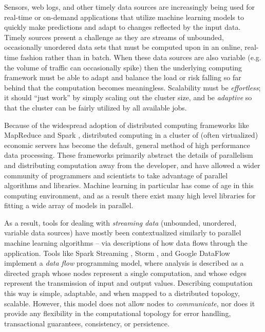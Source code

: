 \documentclass[draftclsnofoot,onecolumn,conference,11pt]{IEEEtran}
\begin{document}
Sensors, web logs, and other timely data sources are increasingly being used for  real-time or on-demand applications that utilize machine learning models to quickly make predictions and adapt to changes reflected by the input data. Timely sources present a challenge as they are streams of unbounded, occasionally unordered data sets that must be computed upon in an online, real-time fashion rather than in batch. When these data sources are also variable (e.g. the volume of traffic can occasionally spike) then the underlying computing framework must be able to adapt and balance the load or risk falling so far behind that the computation becomes meaningless. Scalability must be \textit{effortless}; it should ``just work'' by simply scaling out the cluster size, and be \textit{adaptive} so that the cluster can be fairly utilized by all available jobs.

Because of the widespread adoption of distributed computing frameworks like MapReduce \cite{dean_mapreduce:_2008} and Spark \cite{zaharia_resilient_2012}, distributed computing in a cluster of (often virtualized) economic servers has become the default, general method of high performance data processing. These frameworks primarily abstract the details of parallelism and distributing computation away from the developer, and have allowed a wider community of programmers and scientists to take advantage of parallel algorithms and libraries. Machine learning in particular has come of age in this computing environment, and as a result there exist many high level libraries for fitting a wide array of models in parallel.

As a result, tools for dealing with \textit{streaming data} (unbounded, unordered, variable data sources) have mostly been contextualized similarly to parallel machine learning algorithms -- via descriptions of how data flows through the application. Tools like Spark Streaming \cite{zaharia_discretized_2012}, Storm \cite{toshniwal_storm_2014}, and Google DataFlow \cite{akidau_dataflow_2015} implement a \textit{data flow} programming model, where analysis is described as a directed graph whose nodes represent a single computation, and whose edges represent the transmission of input and output values. Describing computation this way is simple, adaptable, and when mapped to a distributed topology, scalable. However, this model does not allow nodes to \textit{communicate}, nor does it provide any flexibility in the computational topology for error handling, transactional guarantees, consistency, or persistence.
\end{document}
